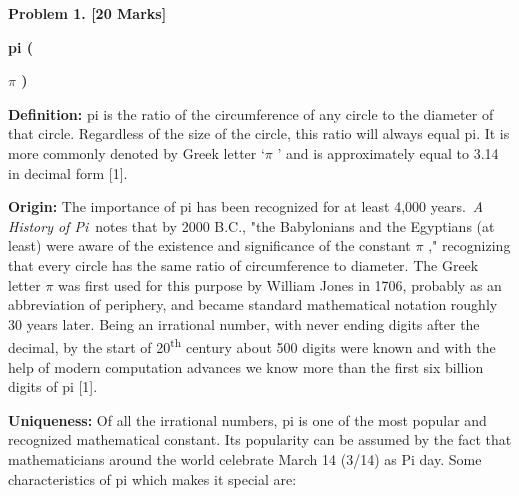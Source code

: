 \documentclass[12pt]{article}
\begin{document}
{\fontsize{14pt}{16.8pt}\selectfont \textbf{Problem 1. [20 Marks]}\par}\par

\begin{Center}
\textbf{pi (}{\fontsize{14pt}{16.8pt}\selectfont \textbf{\textcolor[HTML]{323232}{$ \pi $ )}}\par}
\end{Center}\par

\begin{justify}
\textbf{Definition: }pi is the ratio of the circumference of any circle to the diameter of that circle. Regardless of the size of the circle, this ratio will always equal pi. It is more commonly denoted by Greek letter ‘$ \pi $ ’ and is approximately equal to 3.14 in decimal form [1].
\end{justify}\par

\begin{justify}
\textbf{Origin: }The importance of pi has been recognized for at least 4,000 years. \textit{A History of Pi} notes that by 2000 B.C., "the Babylonians and the Egyptians (at least) were aware of the existence and significance of the constant $ \pi $ ," recognizing that every circle has the same ratio of circumference to diameter. The Greek letter $ \pi $  was first used for this purpose by William Jones in 1706, probably as an abbreviation of periphery, and became standard mathematical notation roughly 30 years later. Being an irrational number, with never ending digits after the decimal, by the start of 20\textsuperscript{th} century about 500 digits were known and with the help of modern computation advances we know more than the first six billion digits of pi [1].
\end{justify}\par

\begin{justify}
\textbf{Uniqueness: }Of all the irrational numbers, pi is one of the most popular and recognized mathematical constant. Its popularity can be assumed by the fact that mathematicians around the world celebrate March 14 (3/14) as Pi day. Some characteristics of pi which makes it special are:
\end{justify}\par
\end{document}
